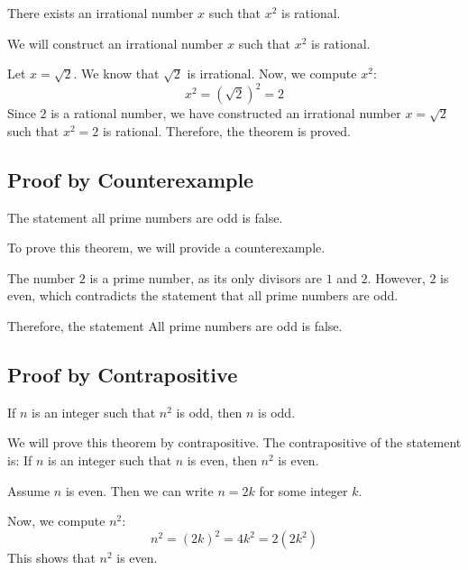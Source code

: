 There exists an irrational number \( x \) such that \( x^2 \) is rational.
\vspace{\baselineskip}

	We will construct an irrational number \( x \) such that \( x^2 \) is rational.
\vspace{\baselineskip}

	Let \( x = \sqrt{2} \). We know that \( \sqrt{2} \) is irrational. Now, we compute \( x^2 \):
	\[
		x^2 = (\sqrt{2})^2 = 2
	\]
	Since \( 2 \) is a rational number, we have constructed an irrational number \( x = \sqrt{2} \) such that \( x^2 = 2 \) is rational.
	Therefore, the theorem is proved.

\QED

\subsection{Proof by Counterexample}

The statement all prime numbers are odd is false.
\vspace{\baselineskip}

	To prove this theorem, we will provide a counterexample.
\vspace{\baselineskip}

	The number \( 2 \) is a prime number, as its only divisors are \( 1 \) and \( 2 \). However, \( 2 \) is even, which contradicts the statement that all prime numbers are odd.
\vspace{\baselineskip}

	Therefore, the statement All prime numbers are odd is false.
\QED

\subsection{Proof by Contrapositive}

If \( n \) is an integer such that \( n^2 \) is odd, then \( n \) is odd.
\vspace{\baselineskip}

	We will prove this theorem by contrapositive. The contrapositive of the statement is: If \( n \) is an integer such that \( n \) is even, then \( n^2 \) is even.
\vspace{\baselineskip}

	Assume \( n \) is even. Then we can write \( n = 2k \) for some integer \( k \).
\vspace{\baselineskip}

	Now, we compute \( n^2 \):
	\[
		n^2 = {(2k)}^2 = 4k^2 = 2(2k^2)
	\]
	This shows that \( n^2 \) is even.
\vspace{\baselineskip}

